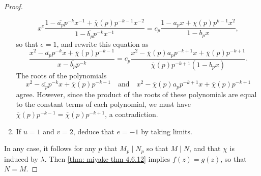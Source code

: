 \documentclass[10pt,leqno,twoside]{article}
\theoremstyle{plain}
\theoremstyle{definition}
\numberwithin{equation}{section}
\numberwithin{lem}{section}
\newcommand{\sai}[1]{\textcolor{red}{#1}}
\begin{document}
\begin{proof}
\begin{enumerate}[label=(\arabic*)]
        \[x^e\frac{1-\overline{a_p}p^{-k}x^{-1} + \overline{\chi}(p)p^{-k-1}x^{-2}}{1-\overline{b_p}p^{-k}x^{-1}} = c_p\frac{1-a_px + \chi(p)p^{k-1}x^2}{1-b_px},\] so that $e = 1$, and rewrite this equation as 
        \[\frac{x^2-\overline{a_p}p^{-k}x + \overline \chi(p)p^{-k-1}}{x-\overline{b_p}p^{-k}} = c_p\frac{x^2-\overline\chi(p)a_pp^{-k+1}x + \overline\chi(p)p^{-k+1}}{\overline\chi(p)p^{-k+1}(1-b_px)}.\] The roots of the polynomials 
        \[x^2-\overline{a_p}p^{-k}x + \overline \chi(p)p^{-k-1}\quad \text{and}\quad x^2-\overline\chi(p)a_pp^{-k+1}x + \overline\chi(p)p^{-k+1}\] agree. However, since the product of the roots of these polynomials are equal to the constant terms of each polynomial, we must have $\overline \chi(p)p^{-k-1} = \overline\chi(p)p^{-k+1}$, a contradiction. 
        
        \item If $u = 1$ and $v = 2$, deduce that $e = -1$ by taking limits.
    \end{enumerate}
    In any case, it follows for any $p$ that $M_p\mid N_p$ so that $M\mid N$, and that $\chi$ is induced by $\lambda$. Then \cref{thm: miyake thm 4.6.12} implies $f(z) = g(z)$, so that $N = M$.
\end{proof}

\end{document}
